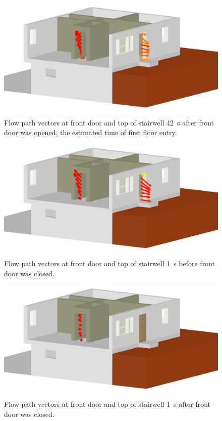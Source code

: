 \documentclass[12pt,oneside]{book}
\begin{document}
\begin{figure}[!ht]
\includegraphics[trim = 2.5in 0in 4in 0in, clip=true, width=.65\textwidth]{../Figures/flow_vector_142s}


\caption[Flow path vectors at front door and top of stairwell at estimated time of first floor entry]
{Flow path vectors at front door and top of stairwell 42~s after front door was opened, the estimated time of first floor entry.}
\label{fig:flow_path_142s}
\end{figure}

\begin{figure}[!ht]
\includegraphics[trim = 2.5in 0in 4in 0in, clip=true, width=.65\textwidth]{../Figures/flow_vector_206s}


\caption[Flow path vectors at front door and top of stairwell 1~s before front door was closed]
{Flow path vectors at front door and top of stairwell 1~s before front door was closed.}
\label{fig:flow_path_206s}
\end{figure}

\begin{figure}[!ht]
\includegraphics[trim = 2.5in 0in 4in 0in, clip=true, width=.65\textwidth]{../Figures/flow_vector_207s}


\caption[Flow path vectors at front door and top of stairwell 1~s after front door was closed]
{Flow path vectors at front door and top of stairwell 1~s after front door was closed.}
\label{fig:flow_path_207s}
\end{figure}
\end{document}
